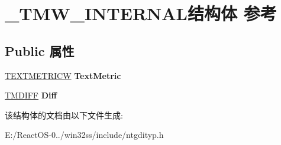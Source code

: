\hypertarget{struct___t_m_w___i_n_t_e_r_n_a_l}{}\section{\+\_\+\+T\+M\+W\+\_\+\+I\+N\+T\+E\+R\+N\+A\+L结构体 参考}
\label{struct___t_m_w___i_n_t_e_r_n_a_l}
\subsection*{Public 属性}
\begin{DoxyCompactItemize}
\item 
\mbox{\label{struct___t_m_w___i_n_t_e_r_n_a_l_a5c63fb4478f6c51df33a8dea9f129f80}} 
\hyperlink{structtag_t_e_x_t_m_e_t_r_i_c_w}{T\+E\+X\+T\+M\+E\+T\+R\+I\+CW} {\bfseries Text\+Metric}
\item 
\mbox{\label{struct___t_m_w___i_n_t_e_r_n_a_l_abbb0fd808171896c6ba238a6cf257754}} 
\hyperlink{struct___t_m_d_i_f_f}{T\+M\+D\+I\+FF} {\bfseries Diff}
\end{DoxyCompactItemize}


该结构体的文档由以下文件生成\+:\begin{DoxyCompactItemize}
\item 
E\+:/\+React\+O\+S-\/0../win32ss/include/ntgdityp.\+h\end{DoxyCompactItemize}
